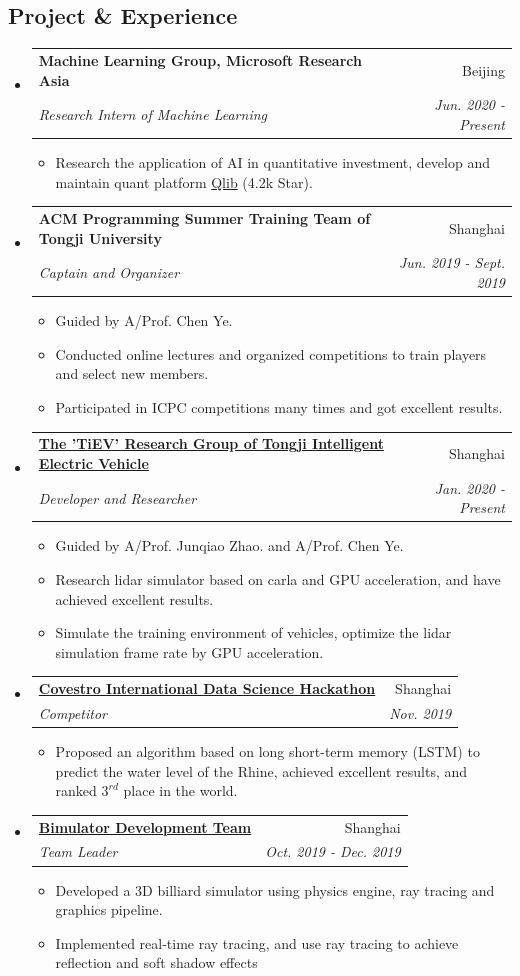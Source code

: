 \documentclass[letterpaper,11pt]{article}
\makeatletter
\newcommand{\resumeItem}[2]{
  \item\small{
    \textbf{#1}{ #2 \vspace{-2pt}}
  }
}
\newcommand{\resumeSubheading}[4]{
  \vspace{-1pt}\item
    \begin{tabular*}{0.97\textwidth}{l@{\extracolsep{\fill}}r}
      \textbf{#1} & #2 \\
      \textit{\small#3} & \textit{\small #4} \\
    \end{tabular*}\vspace{-5pt}
}
\newcommand{\resumeSubHeadingListStart}{\begin{itemize}[leftmargin=*]}
\newcommand{\resumeSubHeadingListEnd}{\end{itemize}}
\newcommand{\resumeItemListStart}{\begin{itemize}}
\newcommand{\resumeItemListEnd}{\end{itemize}\vspace{-5pt}}
\makeatother
\begin{document}
\begin{spacing}{0.985}
\section{Project \& Experience}
  \resumeSubHeadingListStart
    \resumeSubheading
      {Machine Learning Group, Microsoft Research Asia}{Beijing}
      {Research Intern of Machine Learning}{Jun. 2020 - Present}
      \resumeItemListStart
        \resumeItem{}{Research the application of AI in quantitative investment, develop and maintain quant platform \href{https://github.com/microsoft/qlib}{Qlib} (4.2k Star).}
      \resumeItemListEnd


    \resumeSubheading
      {ACM Programming Summer Training Team of Tongji University}{Shanghai}
      {Captain and Organizer}{Jun. 2019 - Sept. 2019}
      \resumeItemListStart
      \resumeItem{}
      {Guided by A/Prof. Chen Ye.}
      \resumeItem{}
          {Conducted online lectures and organized competitions to train players and select new members.}
        \resumeItem{}
          {Participated in ICPC competitions many times and got excellent results.}
      \resumeItemListEnd
    \resumeSubheading
      {\href{https://github.com/tiev-tongji/carla-ex}{The 'TiEV' Research Group of Tongji Intelligent Electric Vehicle}
      }{Shanghai}
      {Developer and Researcher}{Jan. 2020 - Present}
      \resumeItemListStart
        \resumeItem{}
          {Guided by A/Prof. Junqiao Zhao. and A/Prof. Chen Ye.}
         \resumeItem{}
          {Research lidar simulator based on carla and GPU acceleration, and have achieved excellent results.}
         \resumeItem{}
         {Simulate the training environment of vehicles, optimize the lidar simulation frame rate by GPU acceleration.}
          
      \resumeItemListEnd
    \resumeSubheading
      {\href{https://www.covestro.cn/zh-cn/media/news-releases/2019/covestro-holds-its-first-ever-international-data-science-hackathon-across-three-continents}{Covestro International Data Science Hackathon}}{Shanghai}
      {Competitor}{Nov. 2019}
      \resumeItemListStart
        \resumeItem{}
          {Proposed an algorithm based on long short-term memory (LSTM) to predict the water level of the Rhine, achieved excellent results, and ranked $3^{rd}$ place in the world.}
      \resumeItemListEnd
     \resumeSubheading
      {\href{https://github.com/ganler/bimulator}{Bimulator Development Team}}{Shanghai}
      {Team Leader}{Oct. 2019 - Dec. 2019}
      \resumeItemListStart
        \resumeItem{}
          {Developed a 3D billiard simulator using physics engine, ray tracing and graphics pipeline.
         }
         \resumeItem{}
         {Implemented real-time ray tracing, and use ray tracing to achieve reflection and soft shadow effects}
      \resumeItemListEnd
  \resumeSubHeadingListEnd
  

\end{spacing}
\end{document}
